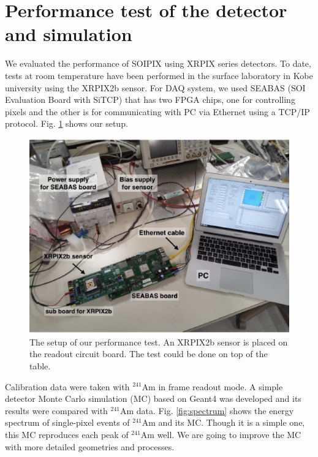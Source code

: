 \documentclass[12pt]{article}
\begin{document}
\section{Performance test of the detector and simulation}
We evaluated the performance of SOIPIX using XRPIX series detectors.  To date, tests at room temperature have been performed in the surface laboratory in Kobe university using the XRPIX2b sensor. For DAQ system, we used SEABAS (SOI Evaluation Board with SiTCP)\cite{Uchida:2008fha} that has two FPGA chips, one for controlling pixels and the other is for communicating with PC via Ethernet using a TCP/IP protocol.  Fig. \ref{fig:setup} shows our setup.


\begin{figure}[htb]
\centering
\includegraphics[height=8 cm]{setup.eps}
\caption{The setup of our performance test.  An XRPIX2b sensor is placed on the readout circuit board.  The test could be done on top of the table.}
\label{fig:setup}
\end{figure}


Calibration data were taken with $^{241}$Am in frame readout mode.  A simple detector Monte Carlo simulation (MC) based on Geant4 \cite{Agostinelli:2002hh, Allison:2006ve} was developed and its results were compared with $^{241}$Am data. Fig. \ref{fig:spectrum} shows the energy spectrum of single-pixel events of $^{241}$Am and its MC.  Though it is a simple one, this MC reproduces each peak of $^{241}$Am well.  We are going to improve the MC with more detailed geometries and processes.
\end{document}
